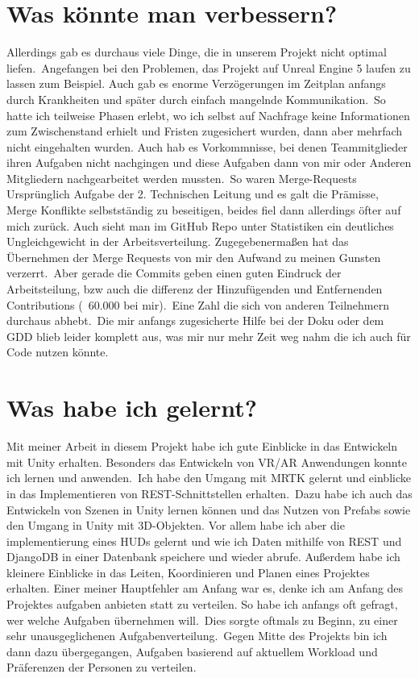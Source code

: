 \documentclass[11pt]{article}
\begin{document}
    \section{Was könnte man verbessern?}\label{sec:chapter_improvables}
    Allerdings gab es durchaus viele Dinge, die in unserem Projekt nicht optimal liefen.\ Angefangen bei den Problemen,
    das Projekt auf Unreal Engine 5 laufen zu lassen zum Beispiel.
    Auch gab es enorme Verzögerungen im Zeitplan anfangs durch Krankheiten und später durch einfach mangelnde
    Kommunikation.\ So hatte ich teilweise Phasen erlebt, wo ich selbst auf Nachfrage keine Informationen zum
    Zwischenstand erhielt und Fristen zugesichert wurden, dann aber mehrfach nicht eingehalten wurden.
    Auch hab es Vorkommnisse, bei denen Teammitglieder ihren Aufgaben nicht nachgingen und diese Aufgaben dann von mir
    oder Anderen Mitgliedern nachgearbeitet werden mussten.\ So waren Merge-Requests Ursprünglich Aufgabe der 2.
    Technischen Leitung und es galt die Prämisse, Merge Konflikte selbstständig zu beseitigen, beides fiel dann
    allerdings öfter auf mich zurück.
    Auch sieht man im GitHub Repo unter Statistiken ein deutliches Ungleichgewicht in der Arbeitsverteilung.
    Zugegebenermaßen hat das Übernehmen der Merge Requests von mir den Aufwand zu meinen Gunsten verzerrt.\ Aber gerade
    die Commits geben einen guten Eindruck der Arbeitsteilung, bzw auch die differenz der Hinzufügenden und Entfernenden
    Contributions (~60.000 bei mir).\ Eine Zahl die sich von anderen Teilnehmern durchaus abhebt.\ Die mir anfangs
    zugesicherte Hilfe bei der Doku oder dem GDD blieb leider komplett aus, was mir nur mehr Zeit weg nahm die ich auch
    für Code nutzen könnte.

    \section{Was habe ich gelernt?}\label{sec:chapter_learnings}
    Mit meiner Arbeit in diesem Projekt habe ich gute Einblicke in das Entwickeln mit Unity erhalten. Besonders das
    Entwickeln von VR/AR Anwendungen konnte ich lernen und anwenden.\ Ich habe den Umgang mit MRTK gelernt und einblicke
    in das Implementieren von REST-Schnittstellen erhalten.\ Dazu habe ich auch das Entwickeln von Szenen in Unity
    lernen können und das Nutzen von Prefabs sowie den Umgang in Unity mit 3D-Objekten.
    Vor allem habe ich aber die implementierung eines HUDs gelernt und wie ich Daten mithilfe von REST und DjangoDB in
    einer Datenbank speichere und wieder abrufe.
    Außerdem habe ich kleinere Einblicke in das Leiten, Koordinieren und Planen eines Projektes erhalten.
    Einer meiner Hauptfehler am Anfang war es, denke ich am Anfang des Projektes aufgaben anbieten statt zu verteilen.
    So habe ich anfangs oft gefragt, wer welche Aufgaben übernehmen will.\ Dies sorgte oftmals zu Beginn, zu einer sehr
    unausgeglichenen Aufgabenverteilung.\ Gegen Mitte des Projekts bin ich dann dazu übergegangen, Aufgaben basierend auf
    aktuellem Workload und Präferenzen der Personen zu verteilen.\
\end{document}
